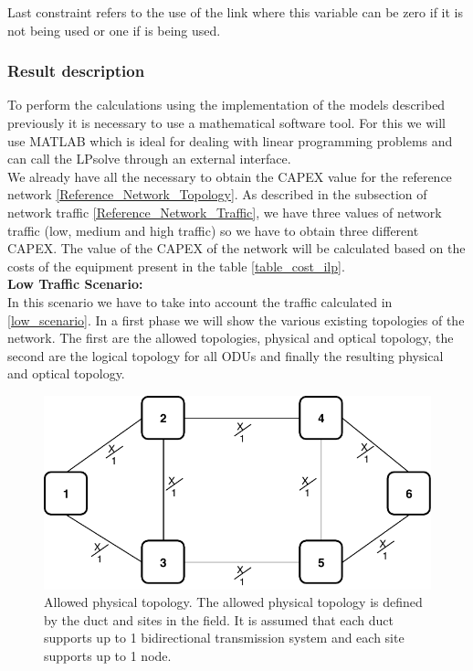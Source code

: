 Last constraint refers to the use of the link where this variable can be zero if it is not being used or one if is being used.\\

\subsubsection{Result description}

To perform the calculations using the implementation of the models described previously it is necessary to use a mathematical software tool. For this we will use MATLAB which is ideal for dealing with linear programming problems and can call the LPsolve through an external interface.\\
We already have all the necessary to obtain the CAPEX value for the reference network \ref{Reference_Network_Topology}. As described in the subsection of network traffic \ref{Reference_Network_Traffic}, we have three values of network traffic (low, medium and high traffic) so we have to obtain three different CAPEX.
The value of the CAPEX of the network will be calculated based on the costs of the equipment present in the table \ref{table_cost_ilp}.\\

\textbf{Low Traffic Scenario:}\\

In this scenario we have to take into account the traffic calculated in \ref{low_scenario}. In a first phase we will show the various existing topologies of the network. The first are the allowed topologies, physical and optical topology, the second are the logical topology for all ODUs and finally the resulting physical and optical topology.\\

\begin{figure}[h!]
\centering
\includegraphics[width=12cm]{sdf/ilp/translucent_survivability/figures/allowed_physical_topology}
\caption{Allowed physical topology. The allowed physical topology is defined by the duct and sites in the field. It is assumed that each duct supports up to 1 bidirectional transmission system and each site supports up to 1 node.}
\label{allowed3_physical_low}
\end{figure}

